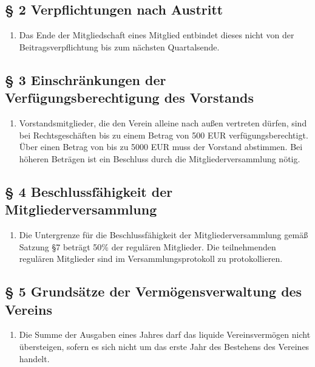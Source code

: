 \documentclass[10pt,a4paper]{article}
\begin{document}
\subsection*{§ 2 Verpflichtungen nach Austritt}
\begin{enumerate}
\item Das Ende der Mitgliedschaft eines Mitglied entbindet dieses nicht von der
	Beitragsverpflichtung bis zum nächsten Quartalsende.
\end{enumerate}

\subsection*{§ 3 Einschränkungen der Verfügungsberechtigung des Vorstands}
\begin{enumerate}
\item Vorstandsmitglieder, die den Verein alleine nach außen vertreten
    dürfen, sind bei Rechtsgeschäften bis zu einem Betrag von 500 EUR
    verfügungsberechtigt. Über einen Betrag von bis zu 5000 EUR muss der
    Vorstand abstimmen. Bei höheren Beträgen ist ein Beschluss durch die
    Mitgliederversammlung nötig.
\end{enumerate}

\subsection*{§ 4 Beschlussfähigkeit der Mitgliederversammlung}
\begin{enumerate}
\item Die Untergrenze für die Beschlussfähigkeit der Mitgliederversammlung
	gemäß Satzung §7 beträgt 50\% der regulären Mitglieder. Die teilnehmenden regulären Mitglieder sind im Versammlungsprotokoll zu protokollieren.
\end{enumerate}

\subsection*{§ 5 Grundsätze der Vermögensverwaltung des Vereins}
\begin{enumerate}
\item Die Summe der Ausgaben eines Jahres darf das liquide Vereinsvermögen
	nicht übersteigen, sofern es sich nicht um das erste Jahr des Bestehens des Vereines handelt.
\end{enumerate}
\end{document}
